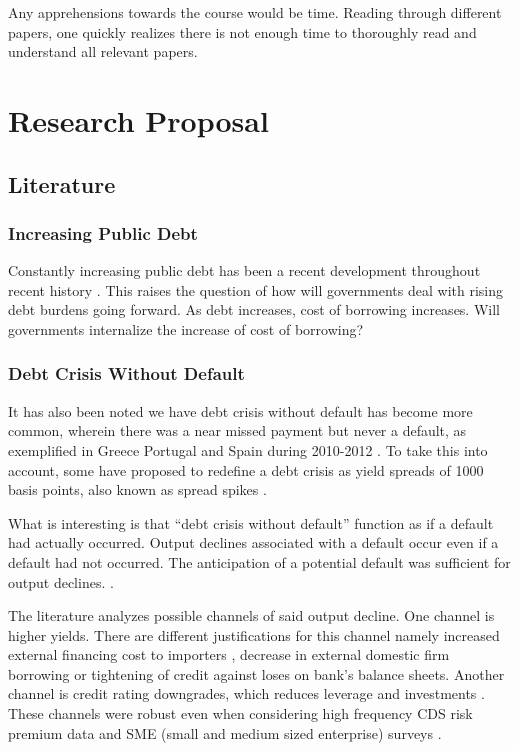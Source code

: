 \documentclass[
  12pt]{article}
\begin{document}
Any apprehensions towards the course would be time. Reading through
different papers, one quickly realizes there is not enough time to
thoroughly read and understand all relevant papers.

\hypertarget{research-proposal}{%
\section{Research Proposal}\label{research-proposal}}

\hypertarget{literature}{%
\subsection{Literature}\label{literature}}

\hypertarget{increasing-public-debt}{%
\subsubsection{Increasing Public Debt}\label{increasing-public-debt}}

Constantly increasing public debt has been a recent development
throughout recent history \citep{mitchener2023}. This raises the
question of how will governments deal with rising debt burdens going
forward. As debt increases, cost of borrowing increases. Will
governments internalize the increase of cost of borrowing?

\hypertarget{debt-crisis-without-default}{%
\subsubsection{Debt Crisis Without
Default}\label{debt-crisis-without-default}}

It has also been noted we have debt crisis without default has become
more common, wherein there was a near missed payment but never a
default, as exemplified in Greece Portugal and Spain during 2010-2012
\citep{mitchener2023}. To take this into account, some have proposed to
redefine a debt crisis as yield spreads of 1000 basis points, also known
as spread spikes \citep{broner2013, aguiar, krishnamurthy}.

What is interesting is that ``debt crisis without default'' function as
if a default had actually occurred. Output declines associated with a
default occur even if a default had not occurred. The anticipation of a
potential default was sufficient for output declines.
\citep{yeyati2011}.

The literature analyzes possible channels of said output decline. One
channel is higher yields. There are different justifications for this
channel namely increased external financing cost to importers
\citep{mendoza2012}, decrease in external domestic firm
borrowing\citep{corsetti2012, das2010, gourinchas2016} or tightening of
credit against loses on bank's balance
sheets\citep{arellano, ferrando2017}. Another channel is credit rating
downgrades, which reduces leverage and investments \citep{almeida2017}.
These channels were robust even when considering high frequency CDS risk
premium data and SME (small and medium sized enterprise) surveys
\citep{brutti2015, bahaj2020, almeida2017}.
\end{document}
